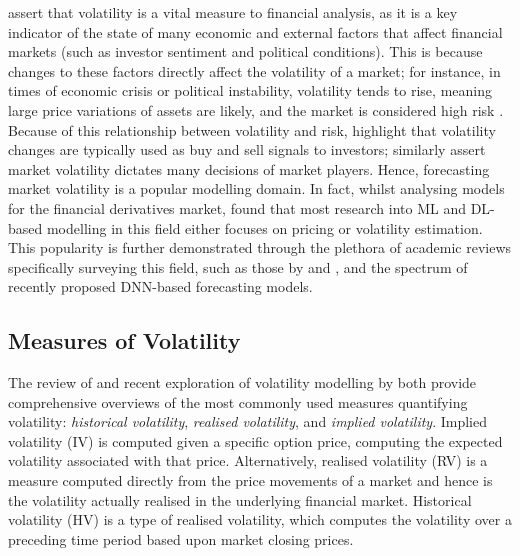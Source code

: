 \documentclass[a4paper, 11pt]{report}
\begin{document}
    \citet{cavalcante-2016} assert that volatility is a vital measure to financial analysis, as it is a key indicator of the state of many economic and external factors that affect financial markets (such as investor sentiment and political conditions). This is because changes to these factors directly affect the volatility of a market; for instance, in times of economic crisis or political instability, volatility tends to rise, meaning large price variations of assets are likely, and the market is considered high risk \citep{sezer-2019}. Because of this relationship between volatility and risk, \citet{tino-2001} highlight that volatility changes are typically used as buy and sell signals to investors; \citet{ge-2022} similarly assert market volatility dictates many decisions of market players. Hence, forecasting market volatility is a popular modelling domain. In fact, whilst analysing models for the financial derivatives market, \citet{ozbayoglu-2020} found that most research into ML and DL-based modelling in this field either focuses on pricing or volatility estimation. This popularity is further demonstrated through the plethora of academic reviews specifically surveying this field, such as those by \citet{poon-2003} and \citet{ge-2022}, and the spectrum of recently proposed DNN-based forecasting models.

    \subsection{Measures of Volatility}

    The review of \citet{ge-2022} and recent exploration of volatility modelling by \citet{tino-2001} both provide comprehensive overviews of the most commonly used measures quantifying volatility: \emph{historical volatility}, \emph{realised volatility}, and \emph{implied volatility}. Implied volatility (IV) is computed given a specific option price, computing the expected volatility associated with that price. Alternatively, realised volatility (RV) is a measure computed directly from the price movements of a market and hence is the volatility actually realised in the underlying financial market. Historical volatility (HV) is a type of realised volatility, which computes the volatility over a preceding time period based upon market closing prices.
\end{document}

